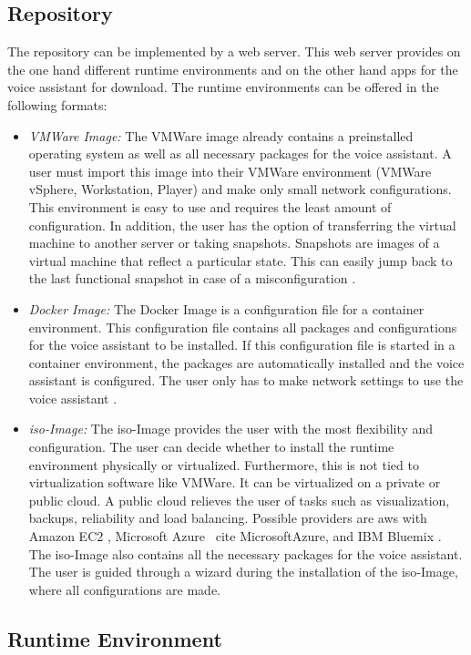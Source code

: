 \subsection{Repository}
The repository can be implemented by a web server. This web server provides on the one hand different runtime environments and on the other hand apps for the voice assistant for download. The runtime environments can be offered in the following formats:
\begin{itemize}
	\item \textsl{VMWare Image:} The VMWare image already contains a preinstalled operating system as well as all necessary packages for the voice assistant. A user must import this image into their VMWare environment (VMWare vSphere, Workstation, Player) and make only small network configurations. This environment is easy to use and requires the least amount of configuration. In addition, the user has the option of transferring the virtual machine to another server or taking snapshots. Snapshots are images of a virtual machine that reflect a particular state. This can easily jump back to the last functional snapshot in case of a misconfiguration \cite{VMWare}.
	\item \textsl{Docker Image:} The Docker Image is a configuration file for a container environment. This configuration file contains all packages and configurations for the voice assistant to be installed. If this configuration file is started in a container environment, the packages are automatically installed and the voice assistant is configured. The user only has to make network settings to use the voice assistant \cite{Docker}.
	\item \textsl{\acs{iso}-Image:} The \acs{iso}-Image provides the user with the most flexibility and configuration. The user can decide whether to install the runtime environment physically or virtualized. Furthermore, this is not tied to virtualization software like VMWare. It can be virtualized on a private or public cloud. A public cloud relieves the user of tasks such as visualization, backups, reliability and load balancing. Possible providers are \ac{aws} with Amazon EC2 \cite{AWSAmazonEC2}, Microsoft Azure \ cite {MicrosoftAzure}, and IBM Bluemix \cite{IBMBluemix}. The \acs{iso}-Image also contains all the necessary packages for the voice assistant. The user is guided through a wizard during the installation of the \acs{iso}-Image, where all configurations are made.
\end{itemize}

\subsection{Runtime Environment}
